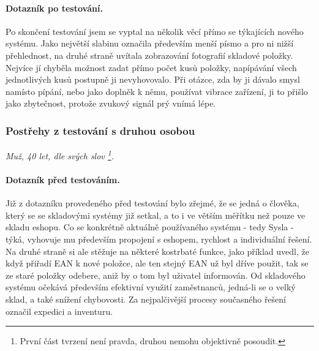 \paragraph{Dotazník po testování.} Po skončení testování jsem se vyptal na několik věcí přímo se týkajících nového systému. Jako největší slabinu označila především menší písmo a pro ni nižší přehlednost, na druhé straně uvítala zobrazování fotografií skladové položky. Nejvíce jí chyběla možnost zadat přímo počet kusů položky, napípávání všech jednotlivých kusů postupně ji nevyhovovalo. Při otázce, zda by ji dávalo smysl namísto pípání, nebo jako doplněk k němu, používat vibrace zařízení, ji to přišlo jako zbytečnost, protože zvukový signál prý vnímá lépe.


\subsubsection{Postřehy z testování s druhou osobou}
\emph{Muž, 40 let, dle svých slov \footnote{První část tvrzení není pravda, druhou nemohu objektivně posoudit.}.}

\paragraph{Dotazník před testováním.} Již z dotazníku provedeného před testování bylo zřejmé, že se jedná o člověka, který se se skladovými systémy již setkal, a to i ve větším měřítku než pouze ve skladu eshopu. Co se konkrétně aktuálně používaného systému - tedy Sysla - týká, vyhovuje mu především propojení s eshopem, rychlost a individuální řešení. Na druhé straně si ale stěžuje na některé kostrbaté funkce, jako příklad uvedl, že když přiřadí EAN k nové položce, ale ten stejný EAN už byl dříve použit, tak se ze staré položky odebere, aniž by o tom byl uživatel informován. Od skladového systému očekává především efektivní využití zaměstnanců, jedná-li se o velký sklad, a také snížení chybovosti. Za nejpalčivější procesy současného řešení označil expedici a inventuru.

